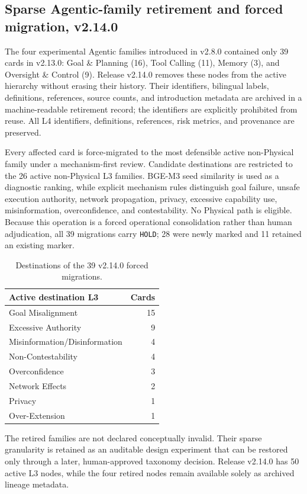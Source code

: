 \documentclass[11pt,a4paper]{article}
\newcommand{\code}[1]{\texttt{#1}}
\begin{document}
\subsection{Sparse Agentic-family retirement and forced migration, v2.14.0}

The four experimental Agentic families introduced in v2.8.0 contained only 39
cards in v2.13.0: Goal \& Planning (16), Tool Calling (11), Memory (3), and
Oversight \& Control (9). Release v2.14.0 removes these nodes from the active
hierarchy without erasing their history. Their identifiers, bilingual labels,
definitions, references, source counts, and introduction metadata are archived
in a machine-readable retirement record; the identifiers are explicitly
prohibited from reuse. All L4 identifiers, definitions, references, risk
metrics, and provenance are preserved.

Every affected card is force-migrated to the most defensible active
non-Physical family under a mechanism-first review. Candidate destinations are
restricted to the 26 active non-Physical L3 families. BGE-M3 seed similarity is
used as a diagnostic ranking, while explicit mechanism rules distinguish goal
failure, unsafe execution authority, network propagation, privacy, excessive
capability use, misinformation, overconfidence, and contestability. No
Physical path is eligible. Because this operation is a forced operational
consolidation rather than human adjudication, all 39 migrations carry
\code{HOLD}; 28 were newly marked and 11 retained an existing marker.

\begin{table}[H]
\centering
\caption{Destinations of the 39 v2.14.0 forced migrations.}
\small
\begin{tabular}{lr}
\toprule
Active destination L3 & Cards \\
\midrule
Goal Misalignment & 15 \\
Excessive Authority & 9 \\
Misinformation/Disinformation & 4 \\
Non-Contestability & 4 \\
Overconfidence & 3 \\
Network Effects & 2 \\
Privacy & 1 \\
Over-Extension & 1 \\
\bottomrule
\end{tabular}
\end{table}

The retired families are not declared conceptually invalid. Their sparse
granularity is retained as an auditable design experiment that can be restored
only through a later, human-approved taxonomy decision. Release v2.14.0 has 50
active L3 nodes, while the four retired nodes remain available solely as
archived lineage metadata.
\end{document}
